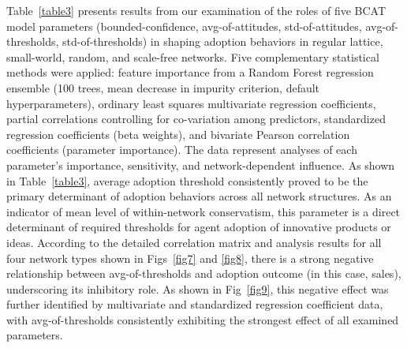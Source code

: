 \documentclass[10pt,letterpaper]{article}
\begin{document}
Table~\ref{table3} presents results from our examination of the roles of five BCAT model parameters (bounded-confidence, avg-of-attitudes, std-of-attitudes, avg-of-thresholds, std-of-thresholds) in shaping adoption behaviors in regular lattice, small-world, random, and scale-free networks. Five complementary statistical methods were applied: feature importance from a Random Forest regression ensemble (100 trees, mean decrease in impurity criterion, default hyperparameters), ordinary least squares multivariate regression coefficients, partial correlations controlling for co-variation among predictors, standardized regression coefficients (beta weights), and bivariate Pearson correlation coefficients (parameter importance). The data represent analyses of each parameter's importance, sensitivity, and network-dependent influence. As shown in Table~\ref{table3}, average adoption threshold consistently proved to be the primary determinant of adoption behaviors across all network structures. As an indicator of mean level of within-network conservatism, this parameter is a direct determinant of required thresholds for agent adoption of innovative products or ideas. According to the detailed correlation matrix and analysis results for all four network types shown in Figs~\ref{fig7} and \ref{fig8}, there is a strong negative relationship between avg-of-thresholds and adoption outcome (in this case, sales), underscoring its inhibitory role. As shown in Fig~\ref{fig9}, this negative effect was further identified by multivariate and standardized regression coefficient data, with avg-of-thresholds consistently exhibiting the strongest effect of all examined parameters.
\end{document}
